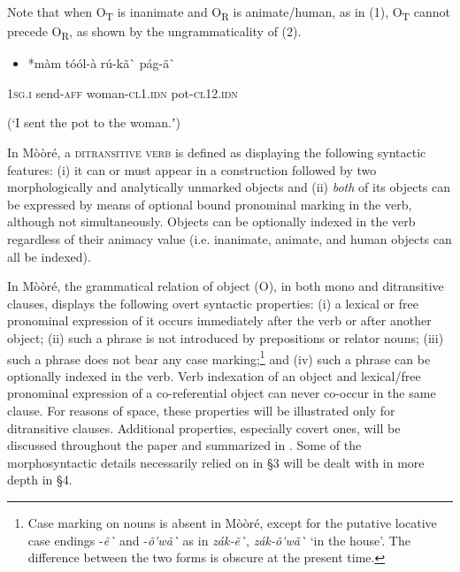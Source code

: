 \documentclass[output=paper]{langsci/langscibook}
\begin{document}
Note that when O\textsubscript{T} is inanimate and O\textsubscript{R} is animate/human, as in (1), O\textsubscript{T} cannot precede O\textsubscript{R}, as shown by the ungrammaticality of (2).

\begin{itemize}
\item \begin{styleNumberedEX}
\label{bkm:Ref444692191}*m\`{a}m  t\'{o}\'{o}l-\`{a}    r\'{u}-k\~{a}\`{ }      p\'{a}g-\~{a}\`{ }
\end{styleNumberedEX}\end{itemize}
\begin{styleGloss}
\textsc{1sg.i}    send-\textsc{aff}  woman-\textsc{cl1.idn}  pot-\textsc{cl12.idn}
\end{styleGloss}

\begin{styleTranslation}
(‘I sent the pot to the woman.ʼ)
\end{styleTranslation}

In M\`{o}\`{o}r\'{e}, a \textsc{ditransitive verb} is defined as displaying the following syntactic features: (i) it can or must appear in a construction followed by two morphologically and analytically unmarked objects and (ii) \textit{both} of its objects can be expressed by means of optional bound pronominal marking in the verb, although not simultaneously. Objects can be optionally indexed in the verb regardless of their animacy value (i.e. inanimate, animate, and human objects can all be indexed).

In M\`{o}\`{o}r\'{e}, the grammatical relation of object (O), in both mono and ditransitive clauses, displays the following overt syntactic properties: (i) a lexical or free pronominal expression of it occurs immediately after the verb or after another object; (ii) such a phrase is not introduced by prepositions or relator nouns; (iii) such a phrase does not bear any case marking;\footnote{ Case marking on nouns is absent in M\`{o}\`{o}r\'{e}, except for the putative locative case endings -\textit{\~{e}\`{ } }and -\textit{\~{o}\'{ }w\~{a}\`{ }} as in \textit{z\'{a}k-\~{e}\`{ }}, \textit{z\'{a}k-\~{o}\'{ }w\~{a}\`{ }} ‘in the house’. The difference between the two forms is obscure at the present time.  }{ }and (iv) such a phrase can be optionally indexed in the verb. Verb indexation of an object and lexical/free pronominal expression of a co-referential object can never co-occur in the same clause. For reasons of space, these properties will be illustrated only for ditransitive clauses. Additional properties, especially covert ones, will be discussed throughout the paper and summarized in . Some of the morphosyntactic details necessarily relied on in §3 will be dealt with in more depth in §4.
\end{document}
